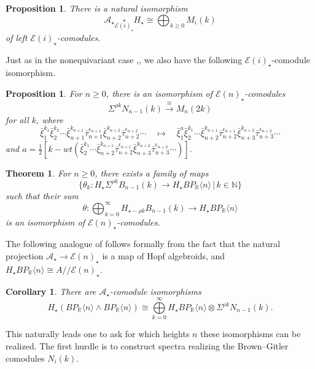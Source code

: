 \documentclass{amsart}
\newtheorem{theorem}[equation]{Theorem}
\newtheorem{proposition}[equation]{Proposition}
\newtheorem{cor}[equation]{Corollary}
\theoremstyle{plain}
\numberwithin{equation}{section}
\numberwithin{figure}{section}
\newcommand{\mN}{{\mathbb N}}
\newcommand{\mR}{{\mathbb R}}
\newcommand{\cA}{{\mathcal A}}
\newcommand{\cE}{{\mathcal E}}
\newcommand{\0}{\langle 0 \rangle }
\newcommand{\n}{\langle n \rangle }
\begin{document}
\begin{proposition}\label{prop:wt-decomp}
There is a natural isomorphism
$$\cA_\star \underset{\mathcal{E} (i)_\star}{\square} H_\star \cong \bigoplus_{k \geq 0} M_i(k)$$
of left $\mathcal{E}(i)_\star$-comodules. 
\end{proposition}

Just as in the nonequivariant case \cite[Lemma~3.4]{Culverp219},\cite[Lemma~4.10]{CulverOddp20}, we also have the following $\cE(i)_{\star}$-comodule isomorphism. 
\begin{proposition}
    For $n \ge 0$, there is an isomorphism of $\cE(n)_{\star}$-comodules
    \[\Sigma^{\rho k} N_{n-1}(k) \xrightarrow{\cong} M_{n}(2k)\]
for all $k$, where 
$$ \bar{\xi}_1^{k_1} \bar{\xi}_2^{k_2} \cdots \bar{\xi}_{n+1}^{k_{n+1}} \bar{\tau}_{n + 1}^{\epsilon_{n +1}} \bar{\xi}_{n + 2}^{k_{n + 2}} \bar{\tau}_{n + 2}^{\epsilon_{n + 2}} \cdots \quad  \mapsto \quad \bar{\xi}_1^{a} \bar{\xi}_2^{k_1} \cdots \bar{\xi}_{n + 2}^{k_{n+1}} \bar{\tau}_{n + 2}^{\epsilon_{n +1}} \bar{\xi}_{n + 3}^{k_{n + 2}} \bar{\tau}_{n + 3}^{\epsilon_{n + 2}}\cdots $$
and
$a = \frac{1}{2}\left[k - wt\left(\bar{\xi}_2^{k_1} \cdots \bar{\xi}_{n + 2}^{k_{n+1}} \bar{\tau}_{n + 2}^{\epsilon_{n +1}} \bar{\xi}_{n + 3}^{k_{n + 2}} \bar{\tau}_{n + 3}^{\epsilon_{n + 2}}\cdots\right)\right].$
\end{proposition}

 
\begin{theorem}\label{thm:homology:decomp}
For $n \geq 0$, there exists a family of maps
$$\{\theta_k: H_\star\Sigma^{\rho k} B_{n - 1}(k) \to H_\star BP_\mR \langle n \rangle \, | \, k \in \mN \} $$
such that their sum
$$  \theta : \bigoplus_{k = 0}^\infty  H_{\star - \rho k} B_{n - 1}(k) \to H_\star BP_\mR \langle n \rangle $$
is an isomorphism of $\mathcal{E}(n)_\star$-comodules. 
\end{theorem}
The following analogue of \cite[Rmk~4.12]{CulverOddp20} follows formally from the fact that the natural projection $\cA_{\star} \to \cE(n)_{\star}$ is a map of Hopf algebroids, and $H_{\star}BP_{\mR}\langle n \rangle \cong A//\cE(n)_{\star}$.

\begin{cor}
    There are $\cA_{\star}$-comodule isomorphisms
    \[H_{\star}( BP_{\mR}\n \wedge BP_{\mR}\n ) \cong \bigoplus \limits_{k=0}^{\infty}H_{\star}BP_{\mR}\n \otimes \Sigma^{\rho k}N_{n - 1}(k) .\]
\end{cor}
This naturally leads one to ask for which heights $n$ these isomorphisms can be realized. The first hurdle is to construct spectra realizing the Brown--Gitler comodules $N_{i}(k)$.
\end{document}
